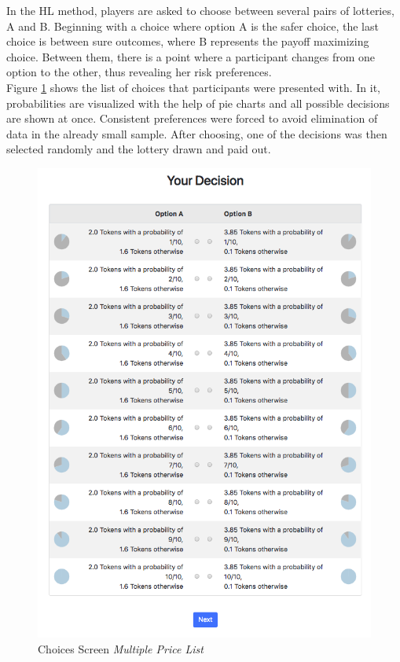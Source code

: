      In the HL method, players are asked to choose between several pairs of lotteries, A and B. Beginning with a choice where option A is the safer choice, the last choice is between sure outcomes, where B represents the payoff maximizing choice. Between them, there is a point where a participant changes from one option to the other, thus revealing her risk preferences.\\
     
     Figure \ref{fig:choices_mpl} shows the list of choices that participants were presented with. In it, probabilities are visualized with the help of pie charts and all possible decisions are shown at once. Consistent preferences were forced to avoid elimination of data in the already small sample. After choosing, one of the decisions was then selected randomly and the lottery drawn and paid out.\\
     
     \begin{figure}
         \centering
         \includegraphics[width=\textwidth]{graphs/Choices_MPL.png}
         \caption{Choices Screen \textit{Multiple Price List}}
         \label{fig:choices_mpl}
     \end{figure}
     

